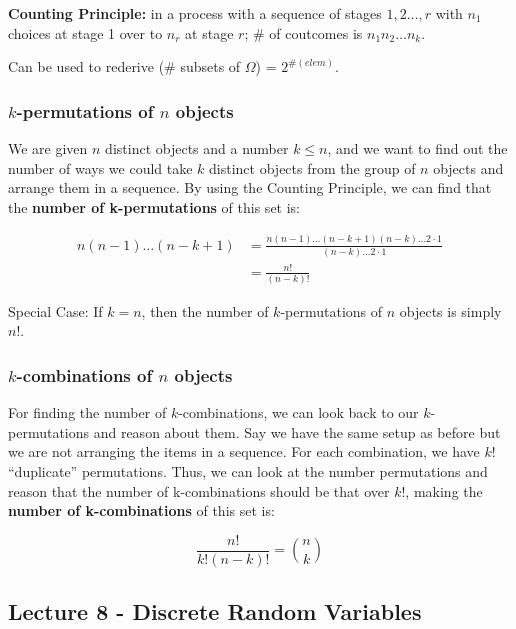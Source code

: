 \documentclass{article}
\begin{document}
\textbf{Counting Principle:} in a process with a sequence of stages
$1, 2 \dots, r$ with $n_1$ choices at stage 1 over to $n_r$ at stage
$r$; \# of coutcomes is $n_1 n_2 \dots n_k$.

Can be used to rederive (\# subsets of $\Omega$) = $2^{\#(elem)}$.

\bigskip
\subsubsection{$k$-permutations of $n$ objects}

We are given $n$ distinct objects and a number $k \leq n$, and we want
to find out the number of ways we could take $k$ distinct objects from
the group of $n$ objects and arrange them in a sequence. By using the
Counting Principle, we can find that the \textbf{number of
  k-permutations} of this set is:

\begin{equation}
  \tag{K-permutations}
  \boxed{
    \begin{aligned}
      n (n-1) \dots (n-k+1)
      &= \frac{n (n-1) \dots (n-k+1) (n-k) \dots 2 \cdot 1}{(n-k)
        \dots 2 \cdot 1} \\
      &= \frac{n!}{(n-k)!}
    \end{aligned}
  }
\end{equation}

Special Case: If $k = n$, then the number of $k$-permutations of $n$
objects is simply $n!$.

\bigskip
\subsubsection{$k$-combinations of $n$ objects}

For finding the number of $k$-combinations, we can look back to our
$k$-permutations and reason about them. Say we have the same setup as
before but we are not arranging the items in a sequence. For each
combination, we have $k!$ ``duplicate'' permutations. Thus, we can
look at the number permutations and reason that the number of
k-combinations should be that over $k!$, making the \textbf{number of
  k-combinations} of this set is:

\begin{equation}
  \tag{K-combinations}
  \boxed{
    \frac{n!}{k!(n-k)!} = \binom{n}{k}
  }
\end{equation}


\medskip\hline
\subsection{Lecture 8 - Discrete Random Variables}
\end{document}
